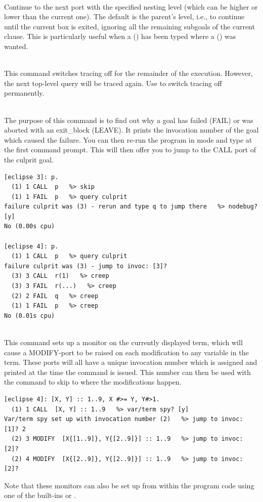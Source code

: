 \begin{descr}{1cm}
\\
Continue to the next port with the specified nesting level (which can
be higher or lower than the current one).
The default is the parent's level, i.e., to continue until the current
box is exited, ignoring all the remaining subgoals of the current clause.
This is particularly useful when a  () has been
typed where a  () was wanted.

\\
This command switches tracing off for the remainder of the execution.
However, the next top-level query will be traced again.
Use  to switch tracing off permanently.

\\
The purpose of this command is to find out why a goal has failed (FAIL)
or was aborted with an exit_block (LEAVE).  It prints the invocation
number of the goal which caused the failure.  You can then re-run the
program in  mode and type  at the first command
  prompt.  This will
then offer you to jump to the CALL port of the culprit goal.
\begin{verbatim}
[eclipse 3]: p.
  (1) 1 CALL  p   %> skip
  (1) 1 FAIL  p   %> query culprit
failure culprit was (3) - rerun and type q to jump there   %> nodebug? [y]
No (0.00s cpu)

[eclipse 4]: p.
  (1) 1 CALL  p   %> query culprit
failure culprit was (3) - jump to invoc: [3]?
  (3) 3 CALL  r(1)   %> creep
  (3) 3 FAIL  r(...)   %> creep
  (2) 2 FAIL  q   %> creep
  (1) 1 FAIL  p   %> creep
No (0.01s cpu)
\end{verbatim}

\\
This command sets up a monitor on the currently displayed term,
which will cause a MODIFY-port to be raised on each modification to
any variable in the term. These ports will all have a unique invocation
number which is assigned and printed at the time the command is issued.
This number can then be used with the  command to skip to where
the modifications happen.
\begin{verbatim}
[eclipse 4]: [X, Y] :: 1..9, X #>= Y, Y#>1.
  (1) 1 CALL  [X, Y] :: 1..9   %> var/term spy? [y]
Var/term spy set up with invocation number (2)   %> jump to invoc: [1]? 2
  (2) 3 MODIFY  [X{[1..9]}, Y{[2..9]}] :: 1..9   %> jump to invoc: [2]?
  (2) 4 MODIFY  [X{[2..9]}, Y{[2..9]}] :: 1..9   %> jump to invoc: [2]?
\end{verbatim}
Note that these monitors can also be set
up from within the program code using one of the built-ins
 or
.


\end{descr}
